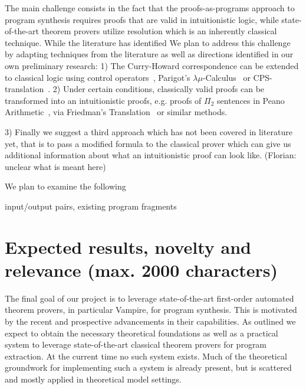 \documentclass[a4paper,12pt]{article}
\begin{document}
The main challenge consists in the fact that the proofs-as-programs approach to program synthesis requires proofs that are valid in intuitionistic logic, while state-of-the-art theorem provers
utilize resolution which is an inherently classical technique.
While the literature has identified
We plan to address this challenge by adapting techniques from the literature as well as directions identified in our own preliminary research:
1) The Curry-Howard correspondence can be extended to classical logic using control operators~\cite{Control1}, Parigot's $\lambda\mu$-Calculus~\cite{Parigot1} or CPS-translation~\cite{CPS1}.
2) Under certain conditions, classically valid proofs can be transformed into an intuitionistic proofs, e.g. proofs of $\Pi_2$ sentences in Peano Arithmetic~\cite{HAPA}, via Friedman's Translation~\cite{Friedman} or similar methods.
	
3) Finally we suggest a third approach which has not been covered in literature yet, that is to pass a modified formula to the classical prover which can give us additional information about what an intuitionistic proof can look like.
(Florian: unclear what is meant here)

We plan to examine the following 

input/output pairs, existing program fragments

\section{Expected results, novelty and relevance (max. 2000 characters)}

The final goal of our project is to leverage state-of-the-art first-order automated
theorem provers, in particular Vampire, for program synthesis. 
This is motivated by the recent and prospective advancements in their capabilities.
As outlined we expect to obtain the necessary theoretical foundations as well
as a practical system to leverage state-of-the-art classical theorem provers for
program extraction. 
At the current time no such system exists. 
Much of the theoretical groundwork for implementing such a system is already present,
but is scattered and mostly applied in theoretical model settings.
\end{document}

